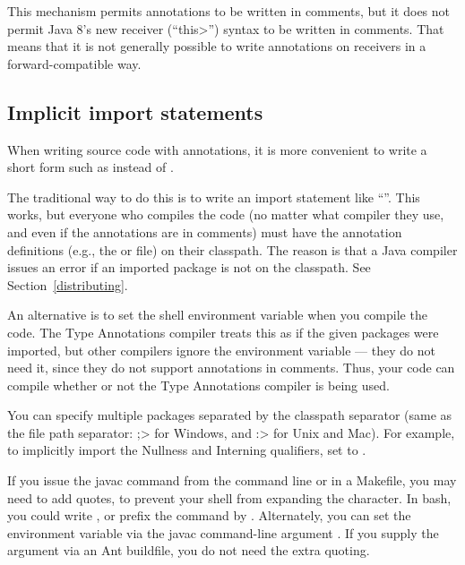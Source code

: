 This mechanism permits annotations to be written in comments, but it does
not permit Java 8's new receiver (``\<this>'') syntax to be written in
comments.  That means that it is not generally possible to write
annotations on receivers in a forward-compatible way.


\subsection{Implicit import statements\label{implicit-import-statements}}

When writing source code with annotations, it is more convenient to write a
short form such as  instead of
.

The traditional way to do this is to write an import statement like
``''.  This works, but everyone who
compiles the code (no matter what compiler they use, and even if the
annotations are in comments) must have the annotation definitions (e.g.,
the  or  file) on their
classpath.  The reason is that a Java compiler issues an error if an
imported package is not on the classpath.  See Section~\ref{distributing}.

\label{jsr308_imports}

An alternative is to set the shell environment variable
 when you compile the code.
The Type Annotations compiler treats this as if the given packages were
imported, but other compilers
ignore the
 environment variable --- they do not need it, since
they do not support annotations in comments.  Thus, your code can compile
whether or not the Type Annotations compiler is being used.

You can specify multiple packages separated by the classpath separator
(same as the file path separator:  \<;> for Windows, and \<:> for Unix and
Mac).  For example, to implicitly import the Nullness and Interning
qualifiers, set  to
.

If you issue the javac command from the command line or in a Makefile, you
may need to add quotes, to prevent your shell from expanding the \code{*}
character.
In bash, you could write , or prefix the 
command by  .
Alternately, you can set the environment variable via the javac
command-line argument .
If you supply the  argument via an Ant buildfile,
you do not need the extra quoting.



